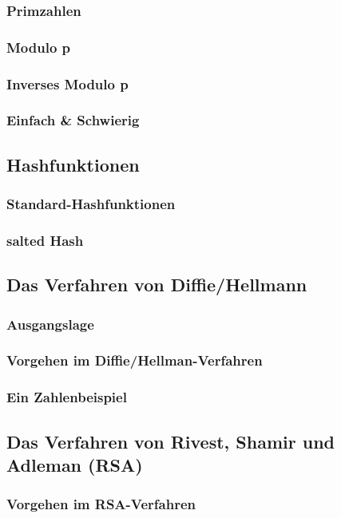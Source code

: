 \subsubsection*{Primzahlen}
\subsubsection*{Modulo p}
\subsubsection*{Inverses Modulo p}
\subsubsection*{Einfach \& Schwierig}

\subsection{Hashfunktionen}
\subsubsection*{Standard-Hashfunktionen}
\subsubsection*{salted Hash}

\subsection{Das Verfahren von Diffie/Hellmann}
\subsubsection*{Ausgangslage}
\subsubsection*{Vorgehen im Diffie/Hellman-Verfahren}
\subsubsection*{Ein Zahlenbeispiel}

\subsection{Das Verfahren von Rivest, Shamir und Adleman (RSA)}
\subsubsection*{Vorgehen im RSA-Verfahren}
